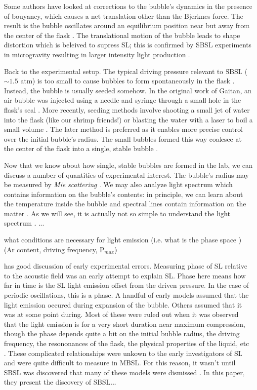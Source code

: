 \documentclass[rmp,aps,nofootinbib,superscriptaddress,floatfix,10pt]{revtex4-2}
\begin{document}
Some authors have looked at corrections to the bubble's dynamics in the presence of bouyancy, which causes a net translation other than the Bjerknes force. The result is the bubble oscillates around an equilibrium position near but away from the center of the flask \cite{matula2000single,matula1997bjerknes,matula1999inertial}. The translational motion of the bubble leads to shape distortion which is beleived to supress SL; this is confirmed by SBSL experiments in microgravity resulting in larger intensity light production \cite{matula2000single}.

Back to the experimental setup. The typical driving pressure relevant to SBSL ($\sim 1.5$ atm) is too small to cause bubbles to form spontaneously in the flask \cite{}. Instead, the bubble is usually seeded somehow. In the original work of Gaitan, an air bubble was injected using a needle and syringe through a small hole in the flask's seal \cite{gaitan1992sonoluminescence}. More recently, seeding methods involve shooting a small jet of water into the flask (like our shrimp friends!) or blasting the water with a laser to boil a small volume \cite{}. The later method is preferred as it enables more precise control over the initial bubble's radius. The small bubbles formed this way coalesce at the center of the flask into a single, stable bubble \cite{}.

Now that we know about how single, stable bubbles are formed in the lab, we can discuss a number of quantities of experimental interest. The bubble's radius may be measured by \emph{Mie scattering} \cite{}. We may also analyze light spectrum which contains information on the bubble's contents: in principle, we can learn about the temperature inside the bubble and spectral lines contain information on the matter \cite{}. As we will see, it is actually not so simple to understand the light spectrum \cite{}. ...

{\color{red} what conditions are necessary for light emission (i.e. what is the phase space \cite{lohse2018bubble}) (Ar content, driving frequency, P$_{max}$)


\cite{gaitan1992sonoluminescence} has good discussion of early experimental errors. Measuring phase of SL relative to the acoustic field was an early attempt to explain SL. Phase here means how far in time is the SL light emission offset from the driven pressure. In the case of periodic oscillations, this is a phase. A handful of early models assumed that the light emission occured during expansion of the bubble. Others assumed that it was at some point during. Most of these were ruled out when it was observed that the light emission is for a very short duration near maximum compression, though the phase depends quite a bit on the initial bubble radius, the driving frequency, the resononances of the flask, the physical properties of the liquid, etc \cite{brenner2002single,gaitan1992sonoluminescence}. These complicated relationships were unkown to the early investigators of SL and were quite difficult to measure in MBSL. For this reason, it wasn't until SBSL was discovered that many of these models were dismissed \cite{gaitan1992sonoluminescence}. In this paper, they present the discovery of SBSL... }
\end{document}
